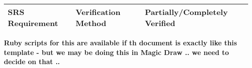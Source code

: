\documentclass[DM,lsstdraft,STS,toc]{lsstdoc}
\begin{document}
\begin{longtable}{|p{}|p{}|p{}|
}\hline
{\bf SRS Requirement} & {\bf Verification Method} & {\bf Partially/Completely Verified}
\\\hline
\end{longtable} \normalsize

\textbf{Ruby scripts for this are available if th document is exactly like this
 template - but we may be doing this in Magic Draw .. we need to decide on
 that ..}
\end{document}

